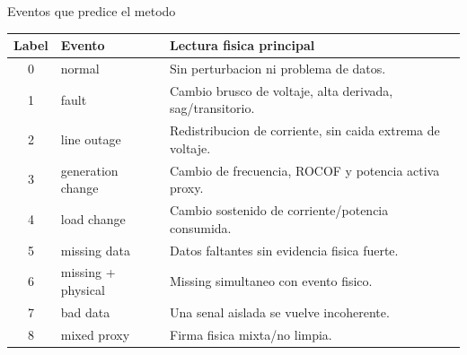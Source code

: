 \documentclass[10pt,aspectratio=169]{beamer}
\begin{document}
\begin{frame}{Eventos que predice el metodo}
\small
\centering
\begin{tabular}{clp{}}
\toprule
\textbf{Label} & \textbf{Evento} & \textbf{Lectura fisica principal}\\
\midrule
0 & normal & Sin perturbacion ni problema de datos.\\
1 & fault & Cambio brusco de voltaje, alta derivada, sag/transitorio.\\
2 & line outage & Redistribucion de corriente, sin caida extrema de voltaje.\\
3 & generation change & Cambio de frecuencia, ROCOF y potencia activa proxy.\\
4 & load change & Cambio sostenido de corriente/potencia consumida.\\
5 & missing data & Datos faltantes sin evidencia fisica fuerte.\\
6 & missing + physical & Missing simultaneo con evento fisico.\\
7 & bad data & Una senal aislada se vuelve incoherente.\\
8 & mixed proxy & Firma fisica mixta/no limpia.\\
\bottomrule
\end{tabular}
\end{frame}
\end{document}
